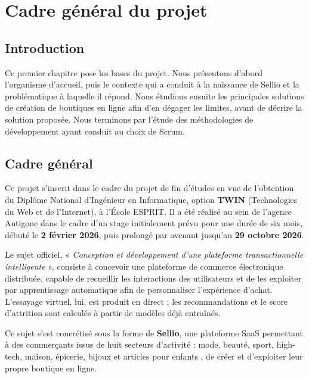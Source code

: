 \thispagestyle{fancy}
\chapter{Cadre général du projet}
\section*{Introduction}
Ce premier chapitre pose les bases du projet. Nous présentons d'abord l'organisme d'accueil, puis le contexte qui a conduit à la naissance de Sellio et la problématique à laquelle il répond. Nous étudions ensuite les principales solutions de création de boutiques en ligne afin d'en dégager les limites, avant de décrire la solution proposée. Nous terminons par l'étude des méthodologies de développement ayant conduit au choix de Scrum.

\section{Cadre général}
Ce projet s'inscrit dans le cadre du projet de fin d'études en vue de l'obtention du Diplôme National d'Ingénieur en Informatique, option \textbf{TWIN} (Technologies du Web et de l'Internet), à l'École ESPRIT. Il a été réalisé au sein de l'agence Antigone dans le cadre d'un stage initialement prévu pour une durée de six mois, débuté le \textbf{2 février 2026}, puis prolongé par avenant jusqu'au \textbf{29 octobre 2026}.

Le sujet officiel, « \textit{Conception et développement d'une plateforme transactionnelle intelligente} », consiste à concevoir une plateforme de commerce électronique distribuée, capable de recueillir les interactions des utilisateurs et de les exploiter par apprentissage automatique afin de personnaliser l'expérience d'achat. L'essayage virtuel, lui, est produit en direct ; les recommandations et le score d'attrition sont calculés à partir de modèles déjà entraînés.

Ce sujet s'est concrétisé sous la forme de \textbf{Sellio}, une plateforme SaaS permettant à des commerçants issus de huit secteurs d'activité : mode, beauté, sport, high-tech, maison, épicerie, bijoux et articles pour enfants , de créer et d'exploiter leur propre boutique en ligne.

